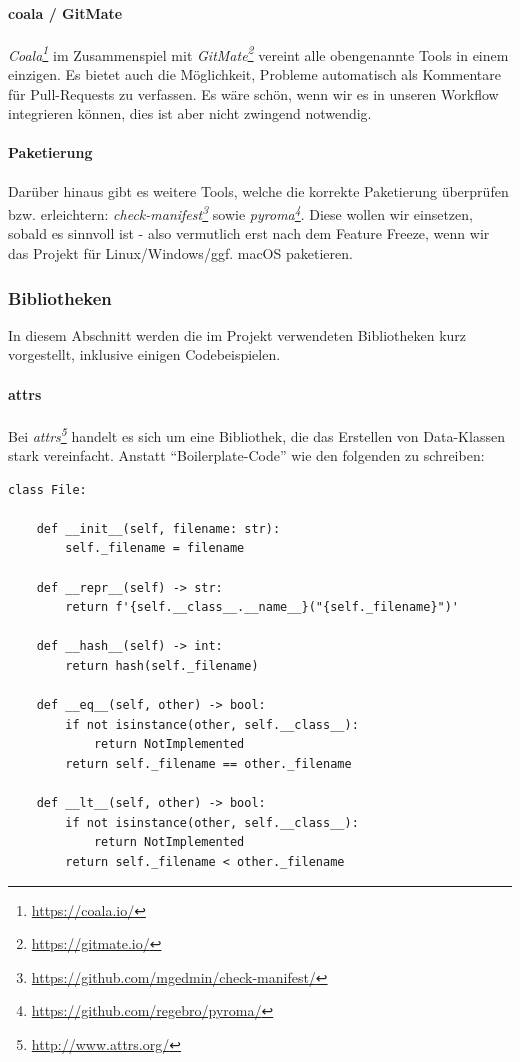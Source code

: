 \documentclass[a4paper]{article}
\newcommand{\tool}[2]{\emph{#1\footnote{\url{#2}}}}
\begin{document}
\paragraph{coala / GitMate} \tool{Coala}{https://coala.io/} im Zusammenspiel mit \tool{GitMate}{https://gitmate.io/} vereint alle obengenannte Tools in einem einzigen. Es bietet auch die Möglichkeit, Probleme automatisch als Kommentare für Pull-Requests zu verfassen. Es wäre schön, wenn wir es in unseren Workflow integrieren können, dies ist aber nicht zwingend notwendig.

\paragraph{Paketierung} Darüber hinaus gibt es weitere Tools, welche die
korrekte Paketierung überprüfen bzw. erleichtern:
\tool{check-manifest}{https://github.com/mgedmin/check-manifest/}
sowie \tool{pyroma}{https://github.com/regebro/pyroma/}. Diese
wollen wir einsetzen, sobald es sinnvoll ist - also vermutlich erst nach dem Feature Freeze, wenn wir das Projekt für Linux/Windows/ggf. macOS paketieren.

\subsubsection{Bibliotheken}

In diesem Abschnitt werden die im Projekt verwendeten Bibliotheken kurz
vorgestellt, inklusive einigen Codebeispielen.

\paragraph{attrs} Bei \tool{attrs}{http://www.attrs.org/} handelt es sich um eine Bibliothek, die das
Erstellen von Data-Klassen stark vereinfacht. Anstatt ``Boilerplate-Code'' wie den folgenden zu schreiben:

\begin{verbatim}
class File:

    def __init__(self, filename: str):
        self._filename = filename

    def __repr__(self) -> str:
        return f'{self.__class__.__name__}("{self._filename}")'

    def __hash__(self) -> int:
        return hash(self._filename)

    def __eq__(self, other) -> bool:
        if not isinstance(other, self.__class__):
            return NotImplemented
        return self._filename == other._filename

    def __lt__(self, other) -> bool:
        if not isinstance(other, self.__class__):
            return NotImplemented
        return self._filename < other._filename
\end{verbatim}
\end{document}
